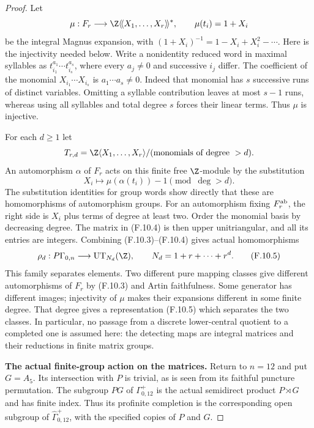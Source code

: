 \begin{proof}
Let
\[
 \mu:F_r\longrightarrow
          \Z\langle\!\langle X_1,\ldots,X_r\rangle\!\rangle^*,
 \qquad \mu(t_i)=1+X_i
\]
be the integral Magnus expansion, with
$(1+X_i)^{-1}=1-X_i+X_i^2-\cdots$.
Here is the injectivity needed below.  Write a nonidentity
reduced word in maximal syllables as
$t_{i_1}^{a_1}\cdots t_{i_s}^{a_s}$, where every
$a_j\ne0$ and successive $i_j$ differ.  The coefficient
of the monomial $X_{i_1}\cdots X_{i_s}$ is
$a_1\cdots a_s\ne0$.  Indeed that monomial has $s$
successive runs of distinct variables.  Omitting a
syllable contribution leaves at most $s-1$ runs,
whereas using all syllables and total degree $s$
forces their linear terms.  Thus $\mu$ is injective.

For each $d\geq1$ let
\[
 T_{r,d}=\Z\langle X_1,\ldots,X_r\rangle/
                   (\text{monomials of degree }>d).
\]
An automorphism $\alpha$ of $F_r$ acts on this finite
free $\Z$-module by the substitution
\[
             X_i\longmapsto\mu(\alpha(t_i))-1
                                      \pmod{\deg>d}.    \tag{F.10.4}
\]
The substitution identities for group words show
directly that these are homomorphisms of automorphism
groups.  For an automorphism fixing $F_r^{\rm ab}$,
the right side is $X_i$ plus terms of degree at least
two.  Order the monomial basis by decreasing degree.
The matrix in (F.10.4) is then upper unitriangular,
and all its entries are integers.  Combining
(F.10.3)--(F.10.4) gives actual homomorphisms
\[
 \rho_d:P\Gamma_{0,n}\longrightarrow
                      \operatorname{UT}_{N_d}(\Z),
 \qquad N_d=1+r+\cdots+r^d.                             \tag{F.10.5}
\]
This family separates elements.  Two different pure
mapping classes give different automorphisms of $F_r$
by (F.10.3) and Artin faithfulness.  Some generator has
different images; injectivity of $\mu$ makes their
expansions different in some finite degree.  That
degree gives a representation (F.10.5) which separates
the two classes.  In particular, no passage from a
discrete lower-central quotient to a completed one
is assumed here: the detecting maps are integral
matrices and their reductions in finite matrix groups.

\textbf{The actual finite-group action on the matrices.}
Return to $n=12$ and put $G=A_5$.  Its intersection
with $P$ is trivial, as is seen from its faithful
puncture permutation.  The subgroup $PG$ of
$\Gamma^+_{0,12}$ is the actual semidirect product
$P\rtimes G$ and has finite index.  Thus its profinite
completion is the corresponding open subgroup of
$\widehat\Gamma^+_{0,12}$, with the specified copies
of $\widehat P$ and $G$.


\end{proof}
